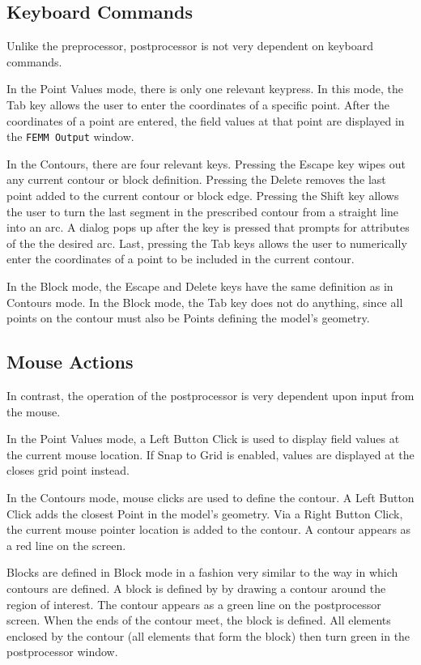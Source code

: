 \documentclass[12pt]{report}
\begin{document}
\subsection{Keyboard Commands}

Unlike the preprocessor, postprocessor is not very dependent on
keyboard commands.

In the Point Values mode, there is only one relevant keypress. In
this mode, the Tab key allows the user to enter the coordinates of
a specific point.  After the coordinates of a point are entered,
the field values at that point are displayed in the {\tt FEMM
Output} window.

In the Contours, there are four relevant keys. Pressing the Escape
key wipes out any current contour or block definition. Pressing the
Delete removes the last point added to the current contour or block
edge.  Pressing the Shift key allows the user to turn the last segment
in the prescribed contour from a straight line into an arc.  A dialog
pops up after the key is pressed that prompts for attributes of the
the desired arc. Last, pressing the Tab keys allows the user to numerically
enter the coordinates of a point to be included in the current
contour.

In the Block mode, the Escape and Delete keys have the same
definition as in Contours mode.  In the Block mode, the Tab key
does not do anything, since all points on the contour must also be
Points defining the model's geometry.

\subsection{Mouse Actions}

In contrast, the operation of the postprocessor is very dependent
upon input from the mouse.

In the Point Values mode, a Left Button Click is used to display
field values at the current mouse location.  If Snap to Grid is
enabled, values are displayed at the closes grid point instead.

In the Contours mode, mouse clicks are used to define the contour.
A Left Button Click adds the closest Point in the model's geometry.
Via a Right Button Click, the current mouse pointer location is
added to the contour.  A contour appears as a red line on the
screen.

Blocks are defined in Block mode in a fashion very similar to the
way in which contours are defined.  A block is defined by by
drawing a contour around the region of interest.  The contour
appears as a green line on the postprocessor screen.  When the ends
of the contour meet, the block is defined.  All elements enclosed
by the contour (all elements that form the block) then turn green
in the postprocessor window.
\end{document}
